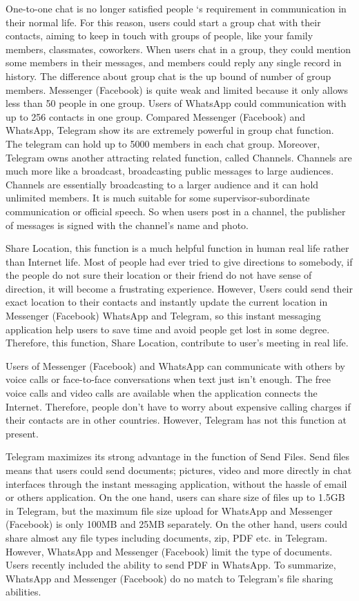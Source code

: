 \documentclass[a4paper,11pt]{article}
\begin{document}
One-to-one chat is no longer satisfied people ‘s requirement in communication in their normal life. For this reason, users could start a group chat with their contacts, aiming to keep in touch with groups of people, like your family members, classmates, coworkers. When users chat in a group, they could mention some members in their messages, and members could reply any single record in history. The difference about group chat is the up bound of number of group members. Messenger (Facebook) is quite weak and limited because it only allows less than 50 people in one group. Users of WhatsApp could communication with up to 256 contacts in one group. Compared Messenger (Facebook) and WhatsApp, Telegram show its are extremely powerful in group chat function. The telegram can hold up to 5000 members in each chat group. Moreover, Telegram owns another attracting related function, called Channels. Channels are much more like a broadcast, broadcasting public messages to large audiences. Channels are essentially broadcasting to a larger audience and it can hold unlimited members. It is much suitable for some supervisor-subordinate communication or official speech. So when users post in a channel, the publisher of messages is signed with the channel's name and photo.  

Share Location, this function is a much helpful function in human real life rather than Internet life. Most of people had ever tried to give directions to somebody, if the people do not sure their location or their friend do not have sense of direction, it will become a frustrating experience. However, Users could send their exact location to their contacts and instantly update the current location in Messenger (Facebook) WhatsApp and Telegram, so this instant messaging application help users to save time and avoid people get lost in some degree. Therefore, this function, Share Location, contribute to user’s meeting in real life.

Users of Messenger (Facebook) and WhatsApp can communicate with others by voice calls or face-to-face conversations when text just isn't enough. The free voice calls and video calls are available when the application connects the Internet. Therefore, people don't have to worry about expensive calling charges if their contacts are in other countries. However, Telegram has not this function at present.


Telegram maximizes its strong advantage in the function of Send Files. Send files means that users could send documents; pictures, video and more directly in chat interfaces through the instant messaging application, without the hassle of email or others application.  On the one hand, users can share size of files up to 1.5GB in Telegram, but the maximum file size upload for WhatsApp and Messenger (Facebook) is only 100MB and 25MB separately. On the other hand, users could share almost any file types including documents, zip, PDF etc. in Telegram. However, WhatsApp and Messenger (Facebook) limit the type of documents. Users recently included the ability to send PDF in WhatsApp. To summarize, WhatsApp and Messenger (Facebook) do no match to Telegram’s file sharing abilities.
\end{document}
